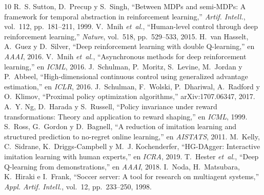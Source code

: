 
\begin{thebibliography}{10}
     R.~S. Sutton, D.~Precup y S.~Singh, ``Between MDPs and semi-MDPs: A framework for temporal abstraction in reinforcement learning,'' \emph{Artif. Intell.}, vol.~112, pp.~181--211, 1999.
     V.~Mnih \emph{et~al.}, ``Human-level control through deep reinforcement learning,'' \emph{Nature}, vol.~518, pp.~529--533, 2015.
     H.~van Hasselt, A.~Guez y D.~Silver, ``Deep reinforcement learning with double Q-learning,'' en \emph{AAAI}, 2016.
     V.~Mnih \emph{et~al.}, ``Asynchronous methods for deep reinforcement learning,'' en \emph{ICML}, 2016.
     J.~Schulman, P.~Moritz, S.~Levine, M.~Jordan y P.~Abbeel, ``High-dimensional continuous control using generalized advantage estimation,'' en \emph{ICLR}, 2016.
     J.~Schulman, F.~Wolski, P.~Dhariwal, A.~Radford y O.~Klimov, ``Proximal policy optimization algorithms,'' arXiv:1707.06347, 2017.
     A.~Y. Ng, D.~Harada y S.~Russell, ``Policy invariance under reward transformations: Theory and application to reward shaping,'' en \emph{ICML}, 1999.
     S.~Ross, G.~Gordon y D.~Bagnell, ``A reduction of imitation learning and structured prediction to no-regret online learning,'' en \emph{AISTATS}, 2011.
     M.~Kelly, C.~Sidrane, K.~Driggs-Campbell y M.~J. Kochenderfer, ``HG-DAgger: Interactive imitation learning with human experts,'' en \emph{ICRA}, 2019.
     T.~Hester \emph{et~al.}, ``Deep Q-learning from demonstrations,'' en \emph{AAAI}, 2018.
     I.~Noda, H.~Matsubara, K.~Hiraki e I.~Frank, ``Soccer server: A tool for research on multiagent systems,'' \emph{Appl. Artif. Intell.}, vol.~12, pp.~233--250, 1998.
\end{thebibliography}


